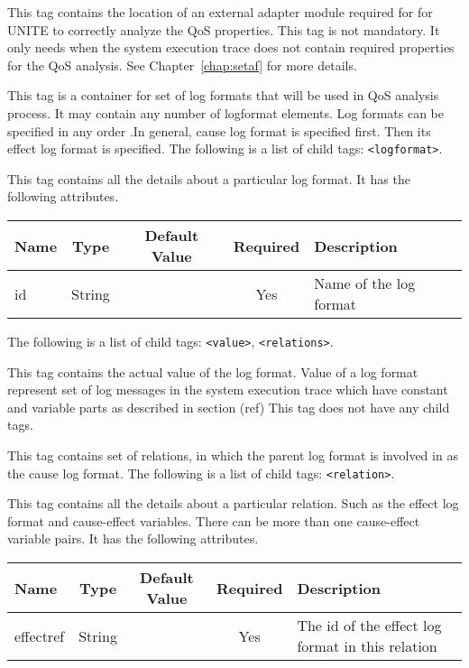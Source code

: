 
This tag contains the location of an external adapter module required for 
for UNITE to correctly analyze the QoS properties. This tag is not 
mandatory. It only needs when the system execution trace does not 
contain required properties for the QoS analysis. See Chapter~\ref{chap:setaf}
for more details.


This tag is a container for set of log formats that will be used in QoS 
analysis process. It may contain any number of logformat elements. 
Log formats can be specified in any order .In general, cause log format 
is specified first. Then its effect log format is specified. 
The following is a list of child tags: \texttt{<logformat>}.


This tag contains all the details about a particular log format. It has the following 
attributes.
\begin{table}[h]
  \begin{tabular}{lcccl}
  \hline
  \textbf{Name} & \textbf{Type} & \textbf{Default Value} & \textbf{Required} & \textbf{Description} \\
  \hline
  id & String  & & Yes & Name of the log format \\
  \end{tabular}
\end{table}

\noindent The following is a list of child tags:
\texttt{<value>}, \texttt{<relations>}.

This tag contains the actual value of the log format. Value of a log 
format represent set of log messages in the system execution trace 
which have constant and variable parts as described in section (ref) 
This tag does not have any child tags.


This tag contains set of relations, in which the parent log format is 
involved in as the cause log format.
The following is a list of child tags: \texttt{<relation>}.


This tag contains all the details about a particular relation. Such 
as the effect log format and cause-effect variables. There can be 
more than one cause-effect variable pairs. It has the following 
attributes.
\begin{table}[h]
  \begin{tabular}{lcccl}
  \hline
  \textbf{Name} & \textbf{Type} & \textbf{Default Value} & \textbf{Required} & \textbf{Description} \\
  \hline
  effectref & String  & & Yes & The id of the effect log format in this relation \\
  \end{tabular}
\end{table}

